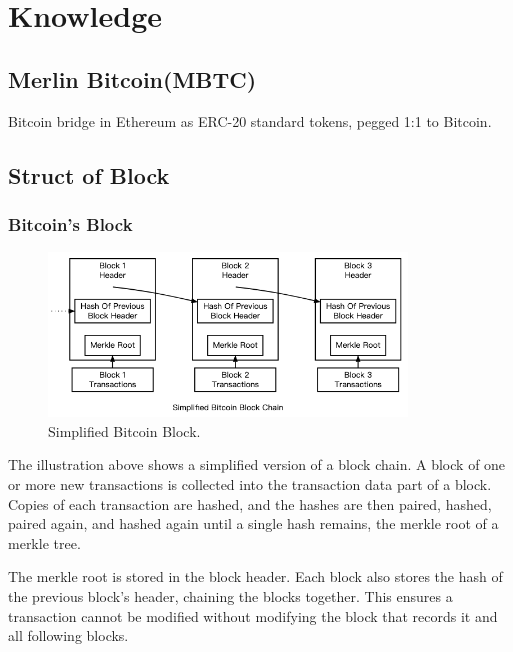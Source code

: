 \documentclass{article}
\begin{document}
\section{Knowledge}
\subsection{Merlin Bitcoin(MBTC)}
\par Bitcoin bridge in Ethereum as ERC-20 standard tokens, pegged 1:1 to Bitcoin.
\subsection{Struct of Block}
\subsubsection{Bitcoin's Block}
\begin{figure}[h]
    \centering
    \includegraphics[width=0.85\textwidth]{bitcoin_block.png}
    \caption{\label{fig:bitcoin_block}Simplified Bitcoin Block.}
    \label{fig:bitcoin_block}
\end{figure}
The illustration above shows a simplified version of a block chain\cite{nakamoto}. A block of one or more new transactions is collected into the transaction data part of a block. Copies of each transaction are hashed, and the hashes are then paired, hashed, paired again, and hashed again until a single hash remains, the merkle root of a merkle tree.
\par The merkle root is stored in the block header. Each block also stores the hash of the previous block’s header, chaining the blocks together. This ensures a transaction cannot be modified without modifying the block that records it and all following blocks.
\end{document}
